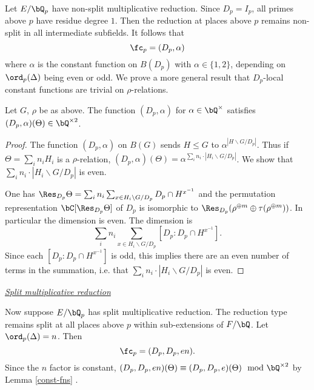 Let $E / \bQ_p$ have non-split multiplicative reduction. Since $D_p = I_p$, all primes above $p$ have residue degree $1$. Then the reduction at places above $p$ remains non-split in all intermediate subfields.
It follows that 
\[ \fc_p = (D_p, \alpha) \]
where $\alpha$ is the constant function on $B(D_p)$ with $\alpha \in \{1, 2\}$, depending on $\ord_p(\Delta)$ being even or odd. 
We prove a more general result that $D_p$-local constant functions are trivial on $\rho$-relations.

\begin{lemma}\label{const-fns}
Let $G$, $\rho$ be as above. The function $(D_p, \alpha)$ for $\alpha \in \bQ^{\times}$ satisfies $(D_p, \alpha)(\Theta) \in \bQ^{\times 2}$.  
\end{lemma}   

\begin{proof}
    The function $(D_p, \alpha)$ on $B(G)$ sends $H \leq G$ to $\alpha^{| H \backslash G / D_p|}$. Thus if $\Theta = \sum_i n_i H_i$ is a $\rho$-relation, $(D_p, \alpha)(\Theta) = \alpha^{ \sum_i n_i \cdot | H_i \backslash G / D_p|}$. We show that $\sum_i n_i \cdot | H_i \backslash G / D_p|$ is even. 

    One has $\Res_{D_p} \Theta = \sum_i n_i \sum_{x \in H_i \backslash G / D_p} D_p \cap H^{x^{-1}}$ and the permutation representation $\bC[\Res_{D_p} \Theta]$ of $D_p$ is isomorphic to $\Res_{D_p} (\rho^{\oplus m} \oplus \tau(\rho^{\oplus m}))$. In particular the dimension is even. The dimension is $$\sum_i n_i \sum_{x \in H_i \backslash G / D_p} [D_p \colon D_p \cap H^{x^{-1}} ].$$ Since each $[D_p \colon D_p \cap H^{x^{-1}} ]$ is odd, this implies there are an even number of terms in the summation, i.e. that $\sum_i n_i \cdot | H_i \backslash G / D_p|$ is even. 
    
\end{proof}

\noindent\underline{\textit{Split multiplicative reduction}}

Now suppose $E / \bQ_p$ has split multiplicative reduction. The reduction type remains split at all places above $p$ within sub-extensions of $F / \bQ$. Let $\ord_p(\Delta) = n$. Then 
\[ \fc_p = (D_p, D_p, en). \]
Since the $n$ factor is constant, $(D_p, D_p, en)(\Theta) \equiv (D_p, D_p, e)(\Theta) \mod \bQ^{\times 2}$ by Lemma \ref{const-fns} .

